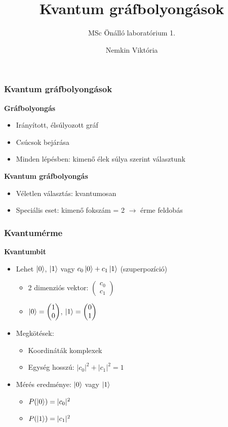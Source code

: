 \documentclass[aspectratio=169]{beamer}
\author{Nemkin Viktória}
\institute{Konzulens: dr. Friedl Katalin}
\title{Kvantum gráfbolyongások}
\subtitle{MSc Önálló laboratórium 1.}
\date{}
\begin{document}
\frame{\titlepage}

\begin{frame}
  \frametitle{Kvantum gráfbolyongások}
  \textbf{Gráfbolyongás}
  \begin{itemize}
    \item Irányított, élsúlyozott gráf
    \item Csúcsok bejárása
    \item Minden lépésben: kimenő élek súlya szerint választunk
  \end{itemize}
  \pause
  \textbf{Kvantum gráfbolyongás}
  \begin{itemize}
    \item Véletlen választás: kvantumosan
    \item Speciális eset: kimenő fokszám = 2 $\rightarrow$ érme feldobás
  \end{itemize}
\end{frame}

\begin{frame}
  \frametitle{Kvantumérme}
  \textbf{Kvantumbit}
  \begin{itemize}
    \item Lehet $\ket{0}$, $\ket{1}$ vagy $c_0\ket{0} + c_1\ket{1}$ (szuperpozíció)
          \begin{itemize}
            \item 2 dimenziós vektor: $\begin{pmatrix} c_0 \\ c_1 \end{pmatrix}$
            \item $\ket{0} = \begin{pmatrix} 1 \\ 0\end{pmatrix}$, $\ket{1} = \begin{pmatrix} 0 \\ 1\end{pmatrix}$
          \end{itemize}
          \pause
    \item Megkötések:
          \begin{itemize}
            \item Koordináták komplexek
            \item Egység hosszú: $|c_0|^2 + |c_1|^2 = 1$
          \end{itemize}
          \pause
    \item Mérés eredménye: $\ket{0}$ vagy $\ket{1}$
          \begin{itemize}
            \item $P(\ket{0}) = |c_0|^2$
            \item $P(\ket{1}) = |c_1|^2$
          \end{itemize}
  \end{itemize}
\end{frame}
\end{document}
